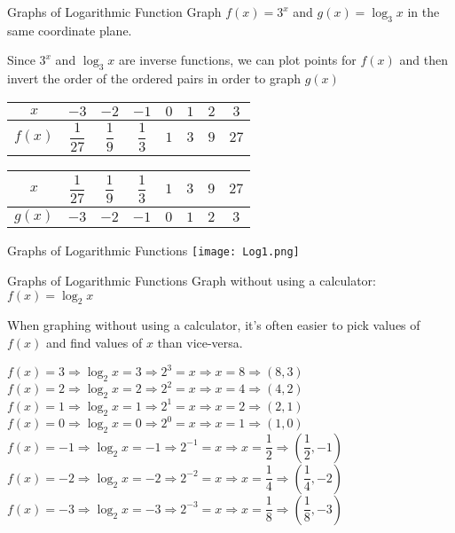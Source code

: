 \documentclass[t, aspectratio=169]{beamer}
\newcommand{\fp}[1]{\left({#1}\right)} %
\def\then{\Rightarrow}
\begin{document}
	\begin{frame}{Graphs of Logarithmic Function}
		Graph $f(x) = 3^x$ and $g(x) = \log_3 x$ in the same coordinate plane. \pause
		
		Since $3^x$ and $\log_3 x$ are inverse functions, we can plot points for $f(x)$ and then invert the order of the ordered pairs in order to graph $g(x)$ \pause
		
		\begin{tabular}{c|ccccccc}
			$x$ & $-3$ & $-2$ & $-1$ & $0$ & $1$ & $2$ & $3$ \\ \hline
			$f(x)$ & $\dfrac{1}{27}$ & $\dfrac19$ & $\dfrac13$ & $1$ & $3$ & $9$ & $27$
		\end{tabular} \pause
	
		\begin{tabular}{c|ccccccc}
			$x$ & $\dfrac{1}{27}$ & $\dfrac19$ & $\dfrac13$ & $1$ & $3$ & $9$ & $27$ \\ \hline
			$g(x)$ & $-3$ & $-2$ & $-1$ & $0$ & $1$ & $2$ & $3$
		\end{tabular}
	\end{frame}

	\begin{frame}{Graphs of Logarithmic Functions}
		\texttt{[image: Log1.png]}
	\end{frame}

	\begin{frame}{Graphs of Logarithmic Functions}
		Graph without using a calculator: $f(x) = \log_2 x$ \pause
		
		When graphing without using a calculator, it's often easier to pick values of $f(x)$ and find values of $x$ than vice-versa. \pause
		
		$f(x) = 3 \then \log_2 x = 3 \then 2^3 = x \then x = 8 \then (8,3)$ \pause \\
		$f(x) = 2 \then \log_2 x = 2 \then 2^2 = x \then x = 4 \then (4,2)$ \pause \\
		$f(x) = 1 \then \log_2 x = 1 \then 2^1 = x \then x = 2 \then (2,1)$ \pause \\
		$f(x) = 0 \then \log_2 x = 0 \then 2^0 = x \then x = 1 \then (1,0)$ \pause \\
		$f(x) = -1 \then \log_2 x = -1 \then 2^{-1} = x \then x = \dfrac12 \then \fp{\dfrac12, -1}$ \pause \\
		$f(x) = -2 \then \log_2 x = -2 \then 2^{-2} = x \then x = \dfrac14 \then \fp{\dfrac14, -2}$ \pause \\
		$f(x) = -3 \then \log_2 x = -3 \then 2^{-3} = x \then x = \dfrac18 \then \fp{\dfrac18, -3}$
	\end{frame}
\end{document}
